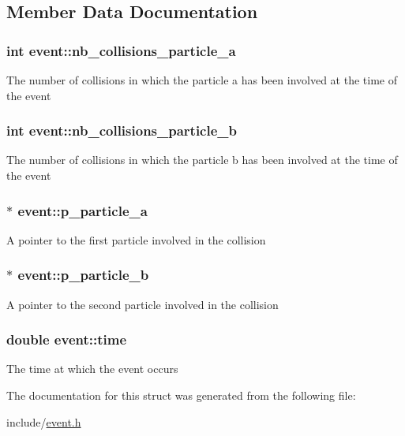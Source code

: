 \subsection{Member Data Documentation}
\hypertarget{structevent_ab480fea5e7249eff2c866c36e3530fb5}{
\subsubsection[{nb\-\_\-collisions\-\_\-particle\-\_\-a}]{\setlength{\rightskip}{0pt plus 5cm}int event\-::nb\-\_\-collisions\-\_\-particle\-\_\-a}}\label{structevent_ab480fea5e7249eff2c866c36e3530fb5}
The number of collisions in which the particle a has been involved at the time of the event \hypertarget{structevent_a7a03ea309a524dfddfde47df334a0589}{
\subsubsection[{nb\-\_\-collisions\-\_\-particle\-\_\-b}]{\setlength{\rightskip}{0pt plus 5cm}int event\-::nb\-\_\-collisions\-\_\-particle\-\_\-b}}\label{structevent_a7a03ea309a524dfddfde47df334a0589}
The number of collisions in which the particle b has been involved at the time of the event \hypertarget{structevent_aed034813d6fc30a0ab3550f6bc6b576b}{
\subsubsection[{p\-\_\-particle\-\_\-a}]{$\ast$ event\-::p\-\_\-particle\-\_\-a}}\label{structevent_aed034813d6fc30a0ab3550f6bc6b576b}
A pointer to the first particle involved in the collision \hypertarget{structevent_a09b317c63eff37aa95c28df226211a89}{
\subsubsection[{p\-\_\-particle\-\_\-b}]{$\ast$ event\-::p\-\_\-particle\-\_\-b}}\label{structevent_a09b317c63eff37aa95c28df226211a89}
A pointer to the second particle involved in the collision \hypertarget{structevent_a2f8d3ecdbdbc49add3f208a9cb16dc9b}{
\subsubsection[{time}]{\setlength{\rightskip}{0pt plus 5cm}double event\-::time}}\label{structevent_a2f8d3ecdbdbc49add3f208a9cb16dc9b}
The time at which the event occurs 

The documentation for this struct was generated from the following file\-:\begin{DoxyCompactItemize}
\item 
include/\hyperlink{event_8h}{event.\-h}\end{DoxyCompactItemize}
